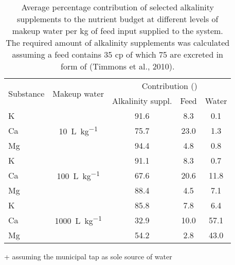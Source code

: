 \begin{table}
\centering
  \begin{threeparttable}
  \caption{Average percentage contribution of selected alkalinity supplements to the nutrient budget at different levels of makeup water per \si{\kg} of feed input supplied to the system. The required amount of alkalinity supplements was calculated assuming a feed contains \SI{35}{\p} \gls{cp} of which \SI{75}{\p} are excreted in form of  (Timmons et al., 2010).}
  \label{tab:alkalinitycont}
    \begin{tabular}{lcccc}

    \toprule
  
    \multirow{2}{*}{Substance}
    & \multirow{2}{*}{Makeup water}
    & \multicolumn{3}{c}{Contribution (\si{\p})}
    \\
    
    \addlinespace
    \cline{3-5}
    \addlinespace
  
    &
    & Alkalinity suppl.
    & Feed
    & Water\tnote{+}
    \\

    \midrule

    K
    & \multirow{3}{*}{\SI{10}{\L\per\kg}}
    & 91.6
    & 8.3
    & 0.1
    \\

    Ca
    &
    & 75.7 
    & 23.0
    & 1.3
    \\

    Mg
    &
    & 94.4
    & 4.8
    & 0.8
    \\

    \addlinespace

    K
    & \multirow{3}{*}{\SI{100}{\L\per\kg}}
    & 91.1
    & 8.3
    & 0.7
    \\

    Ca
    & 
    & 67.6
    & 20.6
    & 11.8
    \\

    Mg
    & 
    & 88.4
    & 4.5
    & 7.1
    \\

    \addlinespace
    
    K
    & \multirow{3}{*}{\SI{1000}{\L\per\kg}}
    & 85.8
    & 7.8
    & 6.4
    \\

    Ca
    &
    & 32.9
    & 10.0
    & 57.1
    \\

    Mg
    &
    & 54.2
    & 2.8
    & 43.0
    \\

  \bottomrule
  \end{tabular}
    \begin{tablenotes}
      \item[+] assuming the municipal tap as sole source of water
    \end{tablenotes}
  \end{threeparttable}
\end{table}
